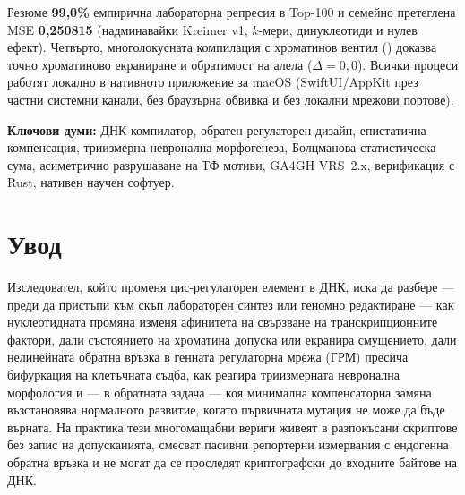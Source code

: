 \documentclass[10.5pt,a4paper]{article}
\begin{document}
\begin{abstractbox}{Резюме}
\textbf{99,0\%} емпирична лабораторна репресия в Top-100 и семейно претеглена MSE \textbf{0,250815} (надминавайки Kreimer v1, $k$-мери, динуклеотиди и нулев ефект). Четвърто, многолокусната компилация с хроматинов вентил () доказва точно хроматиново екраниране и обратимост на алела ($\Delta=0{,}0$). Всички процеси работят локално в нативното приложение за macOS (SwiftUI/AppKit през частни системни канали, без браузърна обвивка и без локални мрежови портове).

\smallskip\noindent\textbf{Ключови думи:} ДНК компилатор, обратен регулаторен дизайн, епистатична компенсация, триизмерна невронална морфогенеза, Болцманова статистическа сума, асиметрично разрушаване на ТФ мотиви, GA4GH VRS~2.x, верификация с Rust, нативен научен софтуер.
\end{abstractbox}

\section{Увод}

Изследовател, който променя цис-регулаторен елемент в ДНК, иска да разбере — преди да пристъпи към скъп лабораторен синтез или геномно редактиране — как нуклеотидната промяна изменя афинитета на свързване на транскрипционните фактори, дали състоянието на хроматина допуска или екранира смущението, дали нелинейната обратна връзка в генната регулаторна мрежа (ГРМ) пресича бифуркация на клетъчната съдба, как реагира триизмерната невронална морфология и — в обратната задача — коя минимална компенсаторна замяна възстановява нормалното развитие, когато първичната мутация не може да бъде върната. На практика тези многомащабни вериги живеят в разпокъсани скриптове без запис на допусканията, смесват пасивни репортерни измервания с ендогенна обратна връзка и не могат да се проследят криптографски до входните байтове на ДНК.
\end{document}

